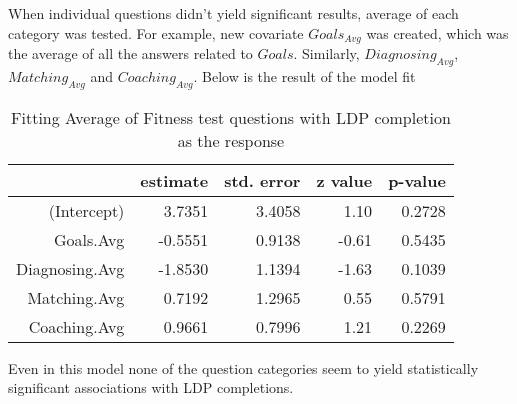 \documentclass[11pt]{extarticle} %
\begin{document}
When individual questions didn't yield significant results, average of each category was tested. For example, new covariate $Goals_{Avg}$ was created, which was the average of all the answers related to $Goals$. Similarly, $Diagnosing_{Avg}$, $Matching_{Avg}$ and $Coaching_{Avg}$. Below is the result of the model fit
\begin{table}[H]
\centering
\begin{tabular}{rrrrr}
  \hline
 & estimate & std. error & z value & p-value \\ 
  \hline
(Intercept) & 3.7351 & 3.4058 & 1.10 & 0.2728 \\ 
  Goals.Avg & -0.5551 & 0.9138 & -0.61 & 0.5435 \\ 
  Diagnosing.Avg & -1.8530 & 1.1394 & -1.63 & 0.1039 \\ 
  Matching.Avg & 0.7192 & 1.2965 & 0.55 & 0.5791 \\ 
  Coaching.Avg & 0.9661 & 0.7996 & 1.21 & 0.2269 \\ 
   \hline
\end{tabular}
\caption{Fitting Average of Fitness test questions with LDP completion as the response}
\end{table}

Even in this model none of the question categories seem to yield statistically significant associations with LDP completions. 
\end{document}
